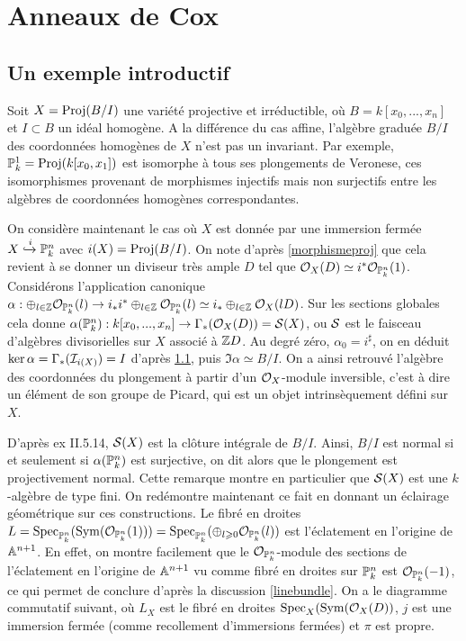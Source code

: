 \chapter{Anneaux de Cox}

\section{Un exemple introductif}

Soit $X=\operatorname{Proj}(B/I)$ une variété projective et irréductible, où $B=k[x_0,...,x_n]$ et $I\subset B$ un idéal homogène. A la différence du cas affine, l'algèbre graduée $B/I$ des coordonnées homogènes de $X$ n'est pas un invariant. Par exemple, $\mathbb{P}^1_k=\operatorname{Proj}(k[x_0,x_1])$ est isomorphe à tous ses plongements de Veronese, ces isomorphismes provenant de morphismes injectifs mais non surjectifs entre les algèbres de coordonnées homogènes correspondantes.

On considère maintenant le cas où $X$ est donnée par une immersion fermée $X\xhookrightarrow{i}\mathbb{P}^n_k $ avec $i(X)=\operatorname{Proj}(B/I)$. On note d'après \ref{morphismeproj} que cela revient à se donner un diviseur très ample $D$ tel que $\mathcal{O}_X(D)\simeq i^*\mathcal{O}_{\mathbb{P}^n_k}(1)$. Considérons l'application canonique $\alpha: \oplus_{l\in\mathbb{Z}}\mathcal{O}_{\mathbb{P}^n_k}(l)\rightarrow i_*i^*\oplus_{l\in \mathbb{Z}}\mathcal{O}_{\mathbb{P}^n_k}(l)\simeq i_*\oplus_{l\in \mathbb{Z}}\mathcal{O}_X(lD)$. Sur les sections globales cela donne $\alpha(\mathbb{P}^n_k): k[x_0,...,x_n]\rightarrow \Gamma_*(\mathcal{O}_X(D))=\mathcal{S}(X)$, ou $\mathcal{S}$ est le faisceau d'algèbres divisorielles sur $X$ associé à $\mathbb{Z} D$. Au degré zéro, $\alpha_0=i^\sharp$, on en déduit $\ker \alpha=\Gamma_*(\mathcal{I} _{i(X)})=I$ d'après \ref{}, puis $\Im \alpha \simeq B/I$. On a ainsi retrouvé l'algèbre des coordonnées du plongement à partir d'un $\mathcal{O}_X$-module inversible, c'est à dire un élément de son groupe de Picard, qui est un objet intrinsèquement défini sur $X$.

D'après \cite{Hartshorne} ex II.5.14, $\mathcal{S}(X)$ est la clôture intégrale de $B/I$. Ainsi, $B/I$ est normal si et seulement si $\alpha(\mathbb{P}^n_k)$ est surjective, on dit alors que le plongement est projectivement normal. Cette remarque montre en particulier que $\mathcal{S}(X)$ est une $k$-algèbre de type fini. On redémontre maintenant ce fait en donnant un éclairage géométrique sur ces constructions. Le fibré en droites $L=\operatorname{Spec}_{\mathbb{P}^n_k}(\operatorname{Sym}(\mathcal{O}_{\mathbb{P}^n_k}(1))) = \operatorname{Spec}_{\mathbb{P}^n_k}(\oplus_{l\geqslant 0}\mathcal{O}_{\mathbb{P}^n_k}(l))$ est l'éclatement en l'origine de $\mathbb{A}^{n+1}$. En effet, on montre facilement que le $\mathcal{O}_{\mathbb{P}^n_k}$-module des sections de l'éclatement en l'origine de $\mathbb{A}^{n+1}$ vu comme fibré en droites sur $\mathbb{P}_k^n$ est $ \mathcal{O}_{\mathbb{P}^n_k}(-1)$, ce qui permet de conclure d'après la discussion \ref{linebundle}. On a le diagramme commutatif suivant, où $L_X$ est le fibré en droites $\operatorname{Spec}_X(\operatorname{Sym}(\mathcal{O}_X(D))$, $j$ est une immersion fermée (comme recollement d'immersions fermées) et $\pi$ est propre.

